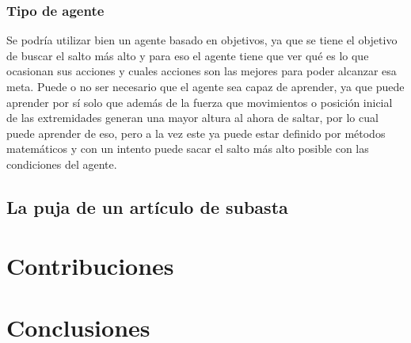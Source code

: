 \documentclass{article}
\begin{document}
            \subsubsection{Tipo de agente}
                Se podría utilizar bien un agente basado en objetivos, ya que se tiene el objetivo de buscar el salto más alto y para eso el agente tiene que ver qué es lo que ocasionan sus acciones y cuales acciones son las mejores para poder alcanzar esa meta. Puede o no ser necesario que el agente sea capaz de aprender, ya que puede aprender por sí solo que además de la fuerza que movimientos o posición inicial de las extremidades generan una mayor altura al ahora de saltar, por lo cual puede aprender de eso, pero a la vez este ya puede estar definido por métodos matemáticos y con un intento puede sacar el salto más alto posible con las condiciones del agente.

        \subsection{La puja de un artículo de subasta}
    \section{Contribuciones}
    \section{Conclusiones}
\end{document}
